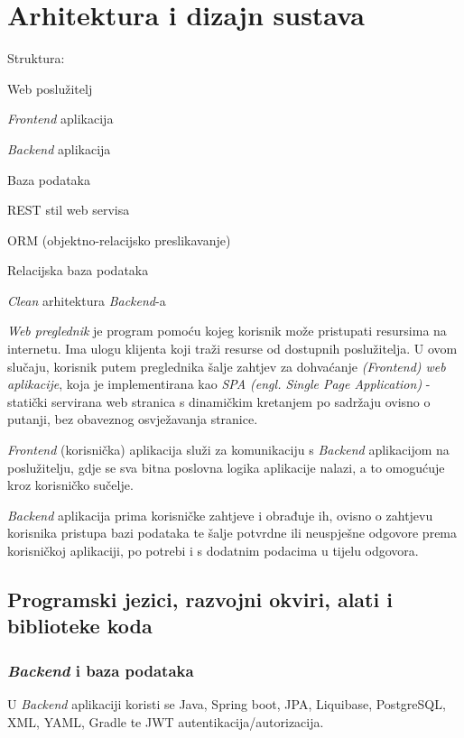 \chapter{Arhitektura i dizajn sustava}

\begin{packed_item}
			\item Struktura:
			\begin{packed_enum}
				\item Web poslužitelj
				\item \textit{Frontend} aplikacija
				\item \textit{Backend} aplikacija
				\item Baza podataka
			\end{packed_enum}
			\item REST stil web servisa
			\item ORM (objektno-relacijsko preslikavanje)
			\item Relacijska baza podataka
			\item \textit{Clean} arhitektura \textit{Backend}-a
		\end{packed_item}


		\textit{Web preglednik} je program pomoću kojeg korisnik može pristupati resursima na internetu. Ima ulogu klijenta koji traži resurse od dostupnih poslužitelja. U ovom slučaju, korisnik putem preglednika šalje zahtjev za dohvaćanje \textit{(Frontend) web aplikacije}, koja je implementirana kao \textit{SPA (engl. Single Page Application)} - statički servirana web stranica s dinamičkim kretanjem po sadržaju ovisno o putanji, bez obaveznog osvježavanja stranice.


		\textit{Frontend} (korisnička) aplikacija služi za komunikaciju s \textit{Backend} aplikacijom na poslužitelju, gdje se sva bitna poslovna logika aplikacije nalazi, a to omogućuje kroz korisničko sučelje.


		\textit{Backend} aplikacija prima korisničke zahtjeve i obrađuje ih, ovisno o zahtjevu korisnika pristupa bazi podataka te šalje potvrdne ili neuspješne odgovore prema korisničkoj aplikaciji, po potrebi i s dodatnim podacima u tijelu odgovora.

		\eject

		\section{Programski jezici, razvojni okviri, alati i biblioteke koda}

		\subsection{\textit{Backend} i baza podataka}
		U \textit{Backend} aplikaciji koristi se Java, Spring boot, JPA, Liquibase, PostgreSQL, XML, YAML, Gradle te JWT autentikacija/autorizacija.


